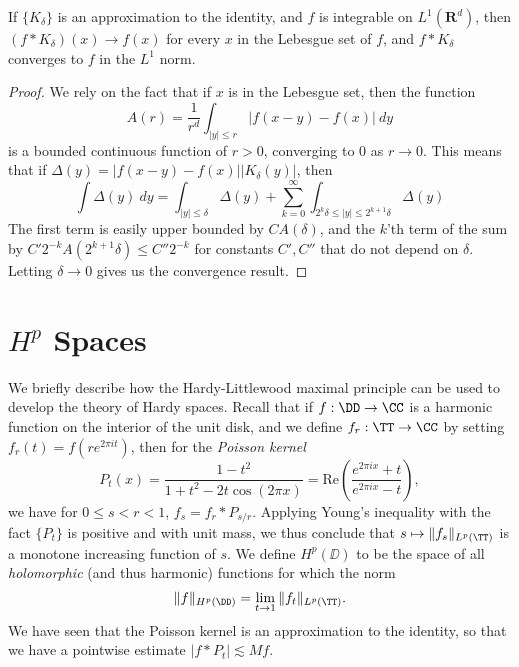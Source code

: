 \begin{theorem}
    If $\{ K_\delta \}$ is an approximation to the identity, and $f$ is integrable on $L^1(\mathbf{R}^d)$, then $(f * K_\delta)(x) \to f(x)$ for every $x$ in the Lebesgue set of $f$, and $f * K_\delta$ converges to $f$ in the $L^1$ norm.
\end{theorem}
\begin{proof}
    We rely on the fact that if $x$ is in the Lebesgue set, then the function
    \[ A(r) = \frac{1}{r^d} \int_{|y| \leq r} |f(x-y) - f(x)|\ dy \]
    is a bounded continuous function of $r > 0$, converging to $0$ as $r \to 0$. This means that if $\Delta(y) = |f(x-y) - f(x)| |K_\delta(y)|$, then
    \[ \int \Delta(y)\ dy = \int_{|y| \leq \delta} \Delta(y) + \sum_{k = 0}^\infty \int_{2^k \delta \leq |y| \leq 2^{k+1} \delta} \Delta(y) \]
    The first term is easily upper bounded by $CA(\delta)$, and the $k$'th term of the sum by $C'2^{-k}A(2^{k+1}\delta) \leq C''2^{-k}$ for constants $C',C''$ that do not depend on $\delta$. Letting $\delta \to 0$ gives us the convergence result.
\end{proof}

\section{$H^p$ Spaces}

We briefly describe how the Hardy-Littlewood maximal principle can be used to develop the theory of Hardy spaces. Recall that if $f: \DD \to \CC$ is a harmonic function on the interior of the unit disk, and we define $f_r: \TT \to \CC$ by setting $f_r(t) = f(r e^{2 \pi it})$, then for the \emph{Poisson kernel}
%
\[ P_t(x) = \frac{1 - t^2}{1 + t^2 - 2t \cos(2 \pi x)} = \text{Re} \left( \frac{e^{2 \pi i x} + t}{e^{2 \pi i x} - t} \right), \]
%
we have for $0 \leq s < r < 1$, $f_s = f_r * P_{s/r}$. Applying Young's inequality with the fact $\{ P_t \}$ is positive and with unit mass, we thus conclude that $s \mapsto \| f_s \|_{L^p(\TT)}$ is a monotone increasing function of $s$. We define $H^p(\DD)$ to be the space of all \emph{holomorphic} (and thus harmonic) functions for which the norm
%
\[ \| f \|_{H^p(\DD)} = \lim_{t \to 1} \| f_t \|_{L^p(\TT)}. \]
%
We have seen that the Poisson kernel is an approximation to the identity, so that we have a pointwise estimate $|f * P_t| \lesssim Mf$.

